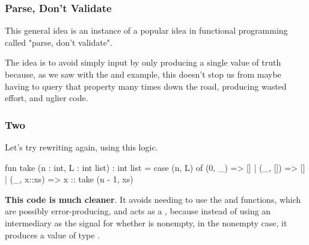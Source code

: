 \documentclass[aspectratio=169]{beamer}
\begin{document}
\begin{frame}[fragile]
  \frametitle{Parse, Don't Validate}

  This general idea is an instance of a popular idea in functional programming
  called "parse, don't validate".

  \pause
  \vspace{\fill}


  \pause
  \vspace{\fill}

  The idea is to avoid simply  input by only producing a single
  value of truth because, as we saw with the  and  
  example, this doesn't stop us from maybe having to query that property many times 
  down the road, producing wasted effort, and uglier code. 

  \pause
  \vspace{\fill}


\end{frame}

\begin{frame}[fragile]
  \frametitle{ Two}

  Let's try rewriting  again, using this logic.

  \pause
  \begin{codeblock}
    fun take (n : int, L : int list) : int list =
      case (n, L) of
        (0, _)     => []
      | (_, [])    => []
      | (_, x::xs) => x :: take (n - 1, xs)
  \end{codeblock}

  \pause
  \vspace{\fill}

  \textbf{This code is much cleaner}. It avoids needing to use the  and
   functions, which are possibly error-producing, and acts as a
  , because instead of using an intermediary  as the
  signal for whether  is nonempty, in the nonempty case, it produces
  a value of type . 
\end{frame}
\end{document}
